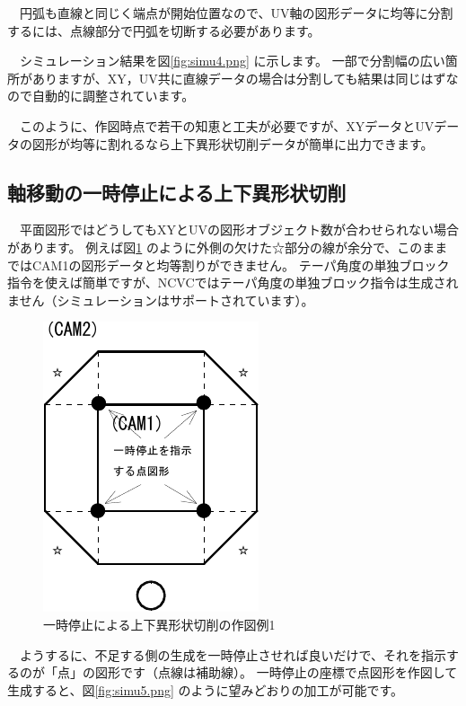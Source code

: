 　円弧も直線と同じく端点が開始位置なので、UV軸の図形データに均等に分割するには、点線部分で円弧を切断する必要があります。

　シミュレーション結果を図\ref{fig:simu4.png} に示します。
一部で分割幅の広い箇所がありますが、XY，UV共に直線データの場合は分割しても結果は同じはずなので自動的に調整されています。

　このように、作図時点で若干の知恵と工夫が必要ですが、XYデータとUVデータの図形が均等に割れるなら上下異形状切削データが簡単に出力できます。


\subsection{軸移動の一時停止による上下異形状切削}
　平面図形ではどうしてもXYとUVの図形オブジェクト数が合わせられない場合があります。
例えば図\ref{fig:sample6.pdf} のように外側の欠けた☆部分の線が余分で、このままではCAM1の図形データと均等割りができません。
テーパ角度の単独ブロック指令を使えば簡単ですが、NCVCではテーパ角度の単独ブロック指令は生成されません（シミュレーションはサポートされています）。

\begin{figure}[H]
\centering
\includegraphics{No2/fig/sample6-crop.pdf}
\caption{一時停止による上下異形状切削の作図例1}
\label{fig:sample6.pdf}
\end{figure}

　ようするに、不足する側の生成を一時停止させれば良いだけで、それを指示するのが「点」の図形です（点線は補助線）。
一時停止の座標で点図形を作図して生成すると、図\ref{fig:simu5.png} のように望みどおりの加工が可能です。

